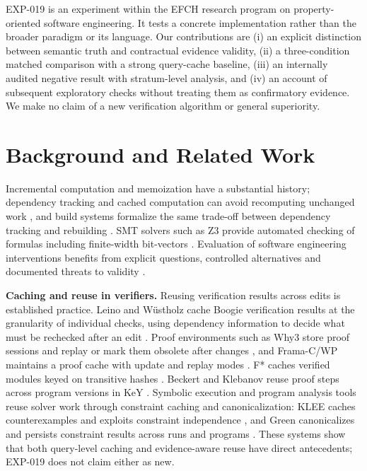 \documentclass[10pt,twocolumn]{article}
\newcommand{\efch}{\textsc{EFCH}}
\begin{document}
EXP-019 is an experiment within the \efch{} research program on property-oriented software engineering. It tests a concrete implementation rather than the broader paradigm or its language. Our contributions are (i) an explicit distinction between semantic truth and contractual evidence validity, (ii) a three-condition matched comparison with a strong query-cache baseline, (iii) an internally audited negative result with stratum-level analysis, and (iv) an account of subsequent exploratory checks without treating them as confirmatory evidence. We make no claim of a new verification algorithm or general superiority.

\section{Background and Related Work}
Incremental computation and memoization have a substantial history; dependency tracking and cached computation can avoid recomputing unchanged work \cite{acar2006}, and build systems formalize the same trade-off between dependency tracking and rebuilding \cite{mokhov2018}. SMT solvers such as Z3 provide automated checking of formulas including finite-width bit-vectors \cite{demoura2008}. Evaluation of software engineering interventions benefits from explicit questions, controlled alternatives and documented threats to validity \cite{wohlin2012}.

\textbf{Caching and reuse in verifiers.} Reusing verification results across edits is established practice. Leino and W\"ustholz cache Boogie verification results at the granularity of individual checks, using dependency information to decide what must be rechecked after an edit \cite{leino2015}. Proof environments such as Why3 store proof sessions and replay or mark them obsolete after changes \cite{why3sessions}, and Frama-C/WP maintains a proof cache with update and replay modes \cite{framacwp}. F* caches verified modules keyed on transitive hashes \cite{fstarcache}. Beckert and Klebanov reuse proof steps across program versions in KeY \cite{beckert2004}. Symbolic execution and program analysis tools reuse solver work through constraint caching and canonicalization: KLEE caches counterexamples and exploits constraint independence \cite{cadar2008}, and Green canonicalizes and persists constraint results across runs and programs \cite{visser2012}. These systems show that both query-level caching and evidence-aware reuse have direct antecedents; EXP-019 does not claim either as new.
\end{document}
